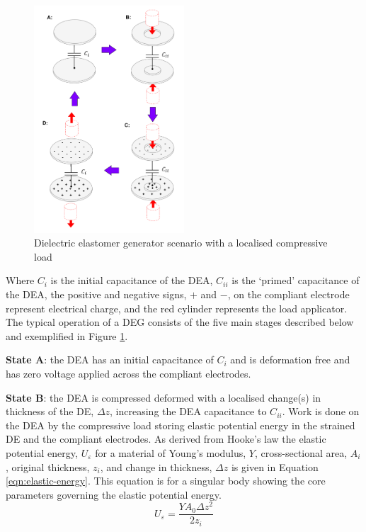 \begin{figure}[H]
	\centering
	\includegraphics[width = 0.5\textwidth]{Figures/DEA-EIT_DEG_ckt_simple.png}
	\vspace{0.2cm}
	\caption{Dielectric elastomer generator scenario with a localised compressive load}
	\label{fig:dea_eit_deg}
\end{figure}
Where $C_i$ is the initial capacitance of the DEA, $C_{ii}$ is the `primed' capacitance of the DEA, the positive and negative signs, $+$ and $-$, on the compliant electrode represent electrical charge, and the red cylinder represents the load applicator. The typical operation of a DEG consists of the five main stages described below and exemplified in Figure \ref{fig:dea_eit_deg}.

\textbf{State A}: the DEA has an initial capacitance of $C_i$ and is deformation free and has zero voltage applied across the compliant electrodes.

\textbf{State B}: the DEA is compressed deformed with a localised change(s) in thickness of the DE, $\Delta z$, increasing the DEA capacitance to $C_{ii}$. Work is done on the DEA by the compressive load storing elastic potential energy in the strained DE and the compliant electrodes.
As derived from Hooke's law the elastic potential energy, $U_{\varepsilon}$ for a material of Young's modulus, $Y$, cross-sectional area, $A_i$, original thickness, $z_i$, and change in thickness, $\Delta z$ is given in Equation \ref{eqn:elastic-energy}. This equation is for a singular body showing the core parameters governing the elastic potential energy.
\begin{equation}
	U_{\varepsilon} = \frac{YA_0\Delta z^2}{2z_i}
	\label{eqn:elastic-energy}
\end{equation}


